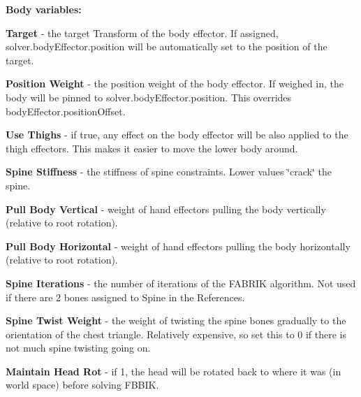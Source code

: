{\bfseries Body variables\+:}
\begin{DoxyItemize}
\item {\bfseries Target} -\/ the target Transform of the body effector. If assigned, solver.\+body\+Effector.\+position will be automatically set to the position of the target.
\item {\bfseries Position Weight} -\/ the position weight of the body effector. If weighed in, the body will be pinned to solver.\+body\+Effector.\+position. This overrides body\+Effector.\+position\+Offset.
\item {\bfseries Use Thighs} -\/ if true, any effect on the body effector will be also applied to the thigh effectors. This makes it easier to move the lower body around.
\item {\bfseries Spine Stiffness} -\/ the stiffness of spine constraints. Lower values \char`\"{}crack\char`\"{} the spine.
\item {\bfseries Pull Body Vertical} -\/ weight of hand effectors pulling the body vertically (relative to root rotation).
\item {\bfseries Pull Body Horizontal} -\/ weight of hand effectors pulling the body horizontally (relative to root rotation).
\item {\bfseries Spine Iterations} -\/ the number of iterations of the F\+A\+B\+R\+IK algorithm. Not used if there are 2 bones assigned to Spine in the References.
\item {\bfseries Spine Twist Weight} -\/ the weight of twisting the spine bones gradually to the orientation of the chest triangle. Relatively expensive, so set this to 0 if there is not much spine twisting going on.
\item {\bfseries Maintain Head Rot} -\/ if 1, the head will be rotated back to where it was (in world space) before solving F\+B\+B\+IK.
\end{DoxyItemize}

